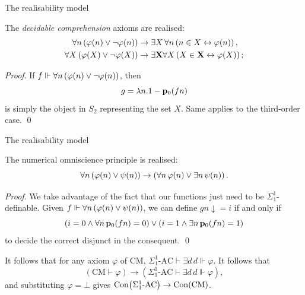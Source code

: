 \documentclass{beamer}
\begin{document}
\begin{frame}{The realisability model}
  \begin{lemma}
    The \emph{decidable comprehension} axioms are realised:
    \begin{align*}
      \forall n \left(\varphi\mleft(n\mright) \lor \neg \varphi\mleft(n\mright)\right) & \rightarrow \exists X \, \forall n \left(n \in X \leftrightarrow \varphi\mleft(n\mright)\right),                \\
      \forall X \left(\varphi\mleft(X\mright) \lor \neg \varphi\mleft(X\mright)\right) & \rightarrow \exists \mathbf{X} \forall X \left(X \in \mathbf{X} \leftrightarrow \varphi\mleft(X\mright)\right);
    \end{align*}
  \end{lemma}

  \vspace{0.6em}

  \emph{Proof}. If $f \Vdash \forall n \left(\varphi\mleft(n\mright) \lor \neg \varphi\mleft(n\mright)\right)$, then
  \[g = \lambda n. 1 - \mathbf{p}_0 \mleft(fn\mright)\]
  is simply the object in $S_2$ representing the set $X$. Same applies to the third-order case. \qed
\end{frame}

\begin{frame}{The realisability model}
  \begin{lemma}
    The numerical omniscience principle is realised:
    \[\forall n \left(\varphi\mleft(n\mright) \lor \psi\mleft(n\mright)\right) \rightarrow \left(\forall n \, \varphi\mleft(n\mright) \lor \exists n \, \psi\mleft(n\mright)\right).\]
  \end{lemma}

  \emph{Proof}. We take advantage of the fact that our functions just need to be $\Sigma^1_1$-definable. Given $f \Vdash \forall n \left(\varphi\mleft(n\mright) \lor \psi\mleft(n\mright)\right)$, we can define $gn {\downarrow} = i$ if and only if
  \[\left(i = 0 \land \forall n \, \mathbf{p}_0 \mleft(fn\mright) = 0\right) \lor \left(i = 1 \land \exists n \, \mathbf{p}_0 \mleft(fn\mright) = 1\right)\]
  to decide the correct disjunct in the consequent. \qed

  \pause

  \vspace{1em}

  It follows that for any axiom $\varphi$ of $\mathrm{CM}$, $\Sigma^1_1\text{-}\mathrm{AC} \vdash \exists d \, d \Vdash \varphi$. It follows that
  \[\left(\mathrm{CM} \vdash \varphi\right) \rightarrow \left(\Sigma^1_1\text{-}\mathrm{AC} \vdash \exists d \, d \Vdash \varphi\right),\]
  and substituting $\varphi = \bot$ gives $\mathrm{Con}\mleft(\Sigma^1_1\text{-}\mathrm{AC}\mright) \rightarrow \mathrm{Con}\mleft(\mathrm{CM}\mright)$.
\end{frame}
\end{document}
